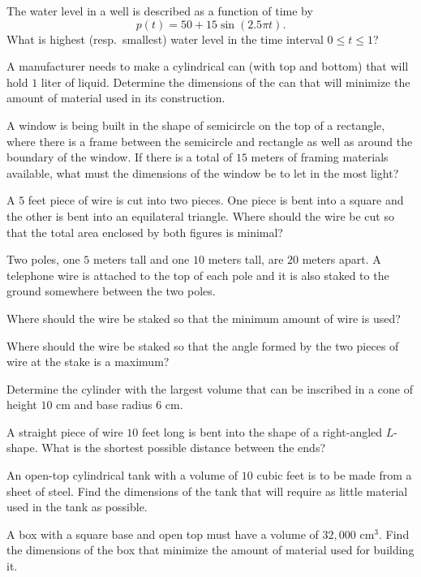 \begin{multicols}{2}
\subprob The water level in a well is described as a function of time by
\[
  p(t) = 50 +15\sin(2.5\pi t).
\]
What is highest (resp.~smallest) water level in the time
interval $0 \leq t \leq 1$?








\problem A manufacturer needs to make a cylindrical can (with top and bottom) that will hold $1$ liter %
of liquid.  Determine the dimensions of the can that will minimize the amount of
material used in its construction.




\problem A window is being built in the shape of semicircle on the top of a %
rectangle, where there is a frame between the semicircle and rectangle as well
as around the boundary of the window. If there is a total of $15$ meters of
framing materials available, what must the dimensions of the window be to let in
the most light?

\problem A $5$ feet piece of wire is cut into two pieces. One piece is bent into %
a square and the other is bent into an equilateral triangle.  Where should the
wire be cut so that the total area enclosed by both figures is minimal?

\problem Two poles, one $5$ meters tall and one $10$ meters tall, are $20$ %
meters apart.  A telephone wire is attached to the top of each pole and it is
also staked to the ground somewhere between the two poles.

\subprob Where should the wire be staked so that the minimum amount of wire is
used?

\subprob Where should the wire be staked so that the angle formed by the two
pieces of wire at the stake is a maximum?


\problem Determine the cylinder with the largest volume that can be %
inscribed in a cone of height $10$ cm and base radius $6$ cm.



\problem A straight piece of wire $10$ feet long is bent into the shape of a %
right-angled $L$-shape. What is the shortest possible distance between the ends?

\problem An open-top cylindrical tank with a volume of $10$ cubic feet is to be %
made from a sheet of steel. Find the dimensions of the tank that will require as
little material used in the tank as possible.

\problem A box with a square base and open top must have a volume of $32,000$ %
  $\text{cm}^3$. Find the dimensions of the box that minimize the amount of material used
for building it.


\end{multicols}
